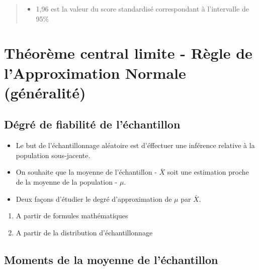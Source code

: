 \documentclass[
]{article}
\providecommand{\tightlist}{%
  \setlength{\itemsep}{0pt}\setlength{\parskip}{0pt}}
\begin{document}
\begin{quote}
\begin{itemize}
\tightlist
\item
  1,96 est la valeur du score standardisé correspondant à l'intervalle
  de 95\%
\end{itemize}
\end{quote}

\hypertarget{thuxe9oruxe8me-central-limite---ruxe8gle-de-lapproximation-normale-guxe9nuxe9ralituxe9}{%
\section{Théorème central limite - Règle de l'Approximation Normale
(généralité)}\label{thuxe9oruxe8me-central-limite---ruxe8gle-de-lapproximation-normale-guxe9nuxe9ralituxe9}}

\hypertarget{duxe9gruxe9-de-fiabilituxe9-de-luxe9chantillon}{%
\subsection{Dégré de fiabilité de
l'échantillon}\label{duxe9gruxe9-de-fiabilituxe9-de-luxe9chantillon}}

\begin{itemize}
\item
  Le but de l'échantillonnage aléatoire est d'éffectuer une inférence
  relative à la population sous-jacente.
\item
  On souhaite que la moyenne de l'échantillon - \(\bar{X}\) soit une
  estimation proche de la moyenne de la population - \(\mu\).
\item
  Deux façons d'étudier le degré d'approximation de \(\mu\) par
  \(\bar{X}\).
\end{itemize}

\begin{enumerate}
\def\labelenumi{\arabic{enumi}.}
\tightlist
\item
  A partir de formules mathématiques
\item
  A partir de la distribution d'échantillonnage
\end{enumerate}

\hypertarget{moments-de-la-moyenne-de-luxe9chantillon}{%
\subsection{Moments de la moyenne de
l'échantillon}\label{moments-de-la-moyenne-de-luxe9chantillon}}
\end{document}
